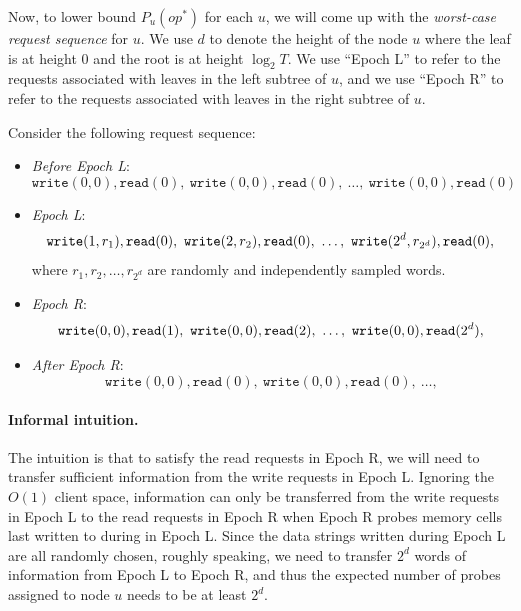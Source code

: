 Now, to lower bound 
$P_{u}(op^*)$ for each $u$, 
we will come up with the {\it worst-case request sequence} for 
$u$. 
We use $d$ to denote the height of the node $u$
where the leaf is at height $0$ and 
the root is at height $\log_2 T$. 
We use ``Epoch L'' to refer 
to the requests associated with leaves in the left subtree
of $u$, and we use 
``Epoch R'' to refer to the requests 
associated with leaves in the right subtree of $u$.


Consider the following request sequence:
\begin{itemize}[leftmargin=5mm]
\item 
{\it Before Epoch L}: 
\[\texttt{write}(0, {0}), \texttt{read}(0), \ 
\texttt{write}(0, {0}), \texttt{read}(0), \ 
\ldots, \  \texttt{write}(0, {0}), \texttt{read}(0)\]
\item 
{\it Epoch L}: 
\[\texttt{write}(1, r_1), \texttt{read}(0), \ 
\texttt{write}(2, r_2), \texttt{read}(0), \ 
\ldots,  \ 
\texttt{write}(2^d, r_{2^d}), \texttt{read}(0),\\
\]
where $r_1, r_2, \ldots,  r_{2^d}$
are randomly and independently sampled words. 
\item 
{\it Epoch R}:
\[
\texttt{write}(0, 0), \texttt{read}(1), \ 
\texttt{write}(0, 0), \texttt{read}(2), \ 
\ldots,  \ 
\texttt{write}(0, 0), \texttt{read}(2^d),\\
\]

\item 
{\it After Epoch R}:
\[
\texttt{write}(0, 0), \texttt{read}(0), \ 
\texttt{write}(0, 0), \texttt{read}(0), \ 
\ldots,  
\]
\end{itemize}



\paragraph{Informal intuition.}
The intuition is that to satisfy the read requests in %
Epoch R, 
we will need to transfer sufficient information
from the write requests in %
Epoch L.
Ignoring the %
$O(1)$ client space, 
information can only be transferred from
the write requests in %
Epoch L 
to the read requests in %
Epoch R
when %
Epoch R probes memory cells last written to 
during %
in Epoch L. 
Since the data strings written during Epoch L
are all randomly chosen,  roughly speaking, 
we need to transfer $2^d$ words of  
information from Epoch L to Epoch R, and thus
the expected number of probes assigned to node $u$
needs to be at least $2^d$.

